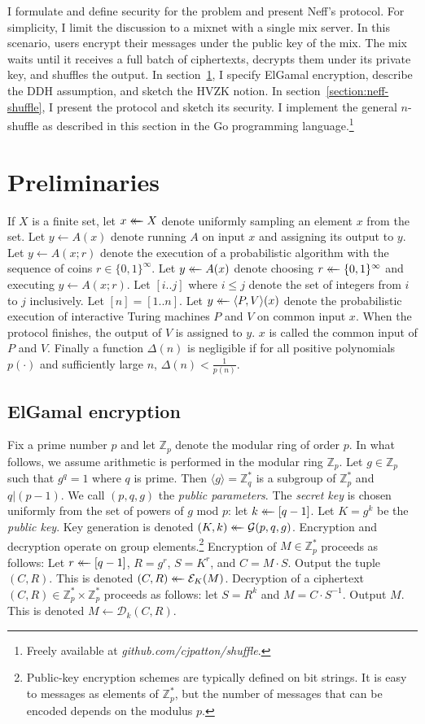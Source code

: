 \documentclass[letter]{article}
\newcounter{foot}
\newcommand{\Zmodp}{\mathbb{Z}_p}
\newcommand{\Zmodq}{\mathbb{Z}_q}
\newcommand{\bits}{\{0,1\}}
\newcommand*\by{\times}
\newcommand{\getsr}{\mathrel{\leftarrow\mkern-14mu\leftarrow}}
\newcommand{\brackets}[1]{\langle #1 \rangle}
\newcommand{\pk}{K}
\newcommand{\sk}{k}
\newcommand{\gen}{\mathcal{G}}
\newcommand{\enc}{\mathcal{E}}
\newcommand{\dec}{\mathcal{D}}
\begin{document}
I formulate and define security for the problem and present Neff's protocol.
For simplicity, I limit the discussion to a mixnet with a single mix server. In
this scenario, users encrypt their messages under the public key of the mix. The
mix waits until it receives a full batch of ciphertexts, decrypts them under its
private key, and shuffles the output. In section~\ref{section:prelim}, I specify
ElGamal encryption, describe the DDH assumption, and sketch the HVZK notion. In
section~\ref{section:neff-shuffle}, I present the protocol and sketch its
security. I implement the general $n$-shuffle as described in this section in
the Go programming language.\footnote{ Freely available at {\it
github.com/cjpatton/shuffle}.}

\section{Preliminaries} \label{section:prelim}

If $X$ is a finite set, let $x \getsr X$ denote uniformly sampling an
element $x$ from the set. Let $y \gets A(x)$ denote running $A$ on input $x$ and
assigning its output to $y$. Let $y \gets A(x; r)$ denote the execution of a
probabilistic algorithm with the sequence of coins $r \in \bits^\infty$. Let $y
\getsr A(x)$ denote choosing $r \getsr \bits^\infty$ and executing $y \gets
A(x; r)$. Let $[i..j]$ where $i \le j$ denote the set of integers from $i$ to
$j$ inclusively.
Let $[n] = [1..n]$.
Let $y \getsr \brackets{P, V}(x)$ denote the probabilistic execution of
interactive Turing machines $P$ and $V$ on common input $x$. When the protocol
finishes, the output of $V$ is assigned to $y$.
$x$ is called the common input of $P$ and $V$.
Finally a function $\Delta(n)$ is
negligible if for all positive polynomials
$p(\cdot)$ and sufficiently large $n$, $\Delta(n) < \frac{1}{p(n)}$.


\subsection{ElGamal encryption}

Fix a prime number $p$ and let $\Zmodp$ denote the modular ring of order $p$.
In what follows, we assume arithmetic is performed in the modular ring $\Zmodp$.
Let $g \in \Zmodp$ such that $g^q = 1$ where $q$ is prime. Then $\brackets{g} =
\Zmodq^*$ is a subgroup of $\Zmodp^*$ and $q | (p-1)$. We call $(p, q, g)$ the
\textit{public parameters}. The \textit{secret key} is chosen uniformly from
the set of powers of $g$ mod $p$: let $\sk \getsr [q-1]$. Let $\pk = g^\sk$ be
the \textit{public key}. Key generation is denoted $(K, k) \getsr \gen(p, q,
g)$.
Encryption and decryption operate on group elements.\footnote{
Public-key encryption schemes are typically defined on bit
strings. It is easy to messages as elements of $\Zmodp^*$, but the number of
messages that can be encoded depends on the modulus $p$.}
Encryption of $M \in \Zmodp^*$ proceeds as follows:
Let $r \getsr [q-1]$,
$R = g^r$,
$S = K^r$, and
$C = M \cdot S$.
Output the tuple $(C, R)$.
This is denoted $(C, R) \getsr \enc_K(M)$.
Decryption of a ciphertext $(C, R) \in \Zmodp^* \by \Zmodp^*$ proceeds as follows:
let $S = R^\sk$ and
$M = C \cdot S^{-1}$.
Output $M$.
This is denoted $M \gets \dec_k(C, R)$.
\end{document}
